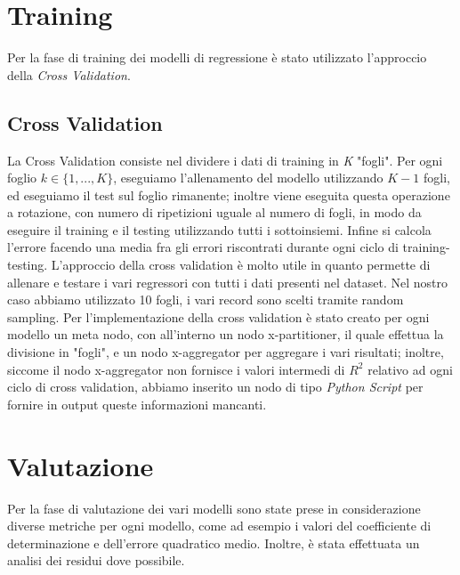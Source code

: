 \documentclass[12pt, a4paper, twocolumn]{article} %
\begin{document}
\section{Training}
Per la fase di training dei modelli di regressione è stato utilizzato l'approccio della \textit{Cross Validation}.

\subsection{Cross Validation}
La Cross Validation consiste nel dividere i dati di training in \textit{K} "fogli". Per ogni foglio $k \in \lbrace1,..., K\rbrace$, eseguiamo l'allenamento del modello utilizzando $K-1$ fogli, ed eseguiamo il test sul foglio rimanente; inoltre viene eseguita questa operazione a rotazione, con numero di ripetizioni uguale al numero di fogli, in modo da eseguire il training e il testing utilizzando tutti i sottoinsiemi. Infine si calcola l'errore facendo una media fra gli errori riscontrati durante ogni ciclo di training-testing. \cite{mlbook} %
L'approccio della cross validation è molto utile in quanto permette di allenare e testare i vari regressori con tutti i dati presenti nel dataset.
Nel nostro caso abbiamo utilizzato 10 fogli, i vari record sono scelti tramite random sampling. Per l'implementazione della cross validation è stato creato per ogni modello un meta nodo, con all'interno un nodo x-partitioner, il quale effettua la divisione in "fogli", e un nodo x-aggregator per aggregare i vari risultati; inoltre, siccome il nodo x-aggregator non fornisce i valori intermedi di $R^{2}$ relativo ad ogni ciclo di cross validation, abbiamo inserito un nodo di tipo \textit{Python Script} per fornire in output queste informazioni mancanti.

\section{Valutazione}
Per la fase di valutazione dei vari modelli sono state prese in considerazione diverse metriche per ogni modello, come ad esempio i valori del coefficiente di determinazione e dell'errore quadratico medio. Inoltre, è stata effettuata un analisi dei residui dove possibile.
\end{document}
